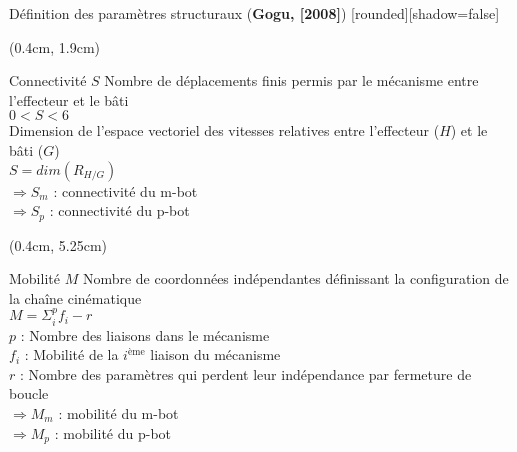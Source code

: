\documentclass[french]{beamer}
\begin{document}
\begin{frame}{Définition des paramètres structuraux (\textbf{Gogu, [2008]})}
[rounded][shadow=false]
{\scriptsize
\begin{textblock*}{12cm}(0.4cm, 1.9cm)
\begin{block}{Connectivité $S$}
Nombre de déplacements finis permis par le mécanisme entre l'effecteur et le bâti\\
\hspace{4.75cm}$ 0 < S < 6 $\\
Dimension de l’espace vectoriel des vitesses relatives entre l'effecteur ($H$) et le bâti ($G$)\\
\hspace{4.5cm}$S = dim(R_{H/G})$\\
\hspace{0.5cm}$\Rightarrow S_m$ : connectivité du m-bot\\
\hspace{0.5cm}$\Rightarrow S_p$ : connectivité du p-bot
\end{block}
\end{textblock*}

\begin{textblock*}{12cm}(0.4cm, 5.25cm)
\begin{block}{Mobilité $M$}
Nombre de coordonnées indépendantes définissant la configuration de la chaîne cinématique\\
\hspace{4.5cm}$M = \Sigma^p_if_i - r$\\
$p$ : Nombre des liaisons dans le mécanisme\\
$f_i$ : Mobilité de la $i^{\text{ème}}$ liaison du mécanisme\\
$r$ : Nombre des paramètres qui perdent leur indépendance par fermeture de boucle\\
\hspace{0.5cm}$\Rightarrow M_m$ : mobilité du m-bot\\
\hspace{0.5cm}$\Rightarrow M_p$ : mobilité du p-bot
\end{block}
\end{textblock*}
}
\end{frame}
\end{document}
